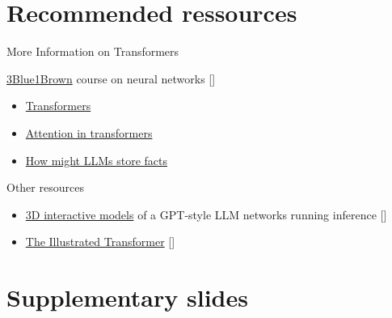 \documentclass[10pt]{beamer}
\newcommand{\citeme}[1]{{\xspace\color{scAqua} \scriptsize [\cite{#1}]}}
\begin{document}




\appendix

\section{Recommended ressources}

\begin{frame}{More Information on Transformers}
	\begin{block}{\href{https://www.youtube.com/playlist?list=PLZHQObOWTQDNU6R1_67000Dx_ZCJB-3pi}{3Blue1Brown} course on neural networks\citeme{Sanderson2024}}
	\begin{itemize}
		\item \href{https://www.youtube.com/watch?v=wjZofJX0v4M&list=PLZHQObOWTQDNU6R1_67000Dx_ZCJB-3pi&index=6}{Transformers}
		\item \href{https://www.youtube.com/watch?v=eMlx5fFNoYc&list=PLZHQObOWTQDNU6R1_67000Dx_ZCJB-3pi&index=7}{Attention in transformers}
		\item \href{https://www.youtube.com/watch?v=9-Jl0dxWQs8&list=PLZHQObOWTQDNU6R1_67000Dx_ZCJB-3pi&index=8}{How might LLMs store facts}
	\end{itemize}
\end{block}
	\begin{block}{Other resources}
	\begin{itemize}
		\item \href{https://bbycroft.net/llm}{3D interactive models} of a GPT-style LLM networks running inference\citeme{Bycroft2023}
		\item \href{http://jalammar.github.io/illustrated-transformer/}{The Illustrated Transformer}\citeme{Alammar2018}
	\end{itemize}
	\end{block}
\end{frame}

\section{Supplementary slides}
\end{document}
